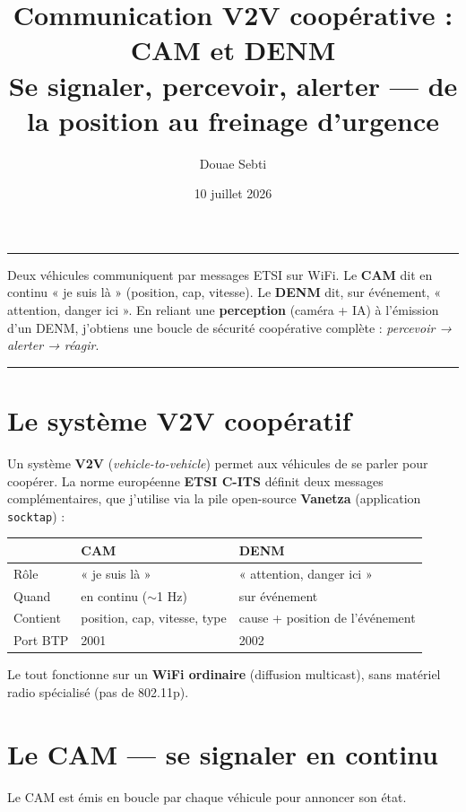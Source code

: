 \documentclass[a4paper,11pt]{article}
\title{\vspace{-1cm}\textbf{Communication V2V coopérative : CAM et DENM\\[3pt]
\large Se signaler, percevoir, alerter --- de la position au freinage d'urgence}}
\author{Douae Sebti}
\date{10 juillet 2026}
\newcommand{\code}[1]{\texttt{#1}}
\begin{document}
\maketitle
\vspace{-6pt}\hrule\vspace{8pt}

\begin{note}
Deux véhicules communiquent par messages ETSI sur WiFi. Le \textbf{CAM} dit en continu
« je suis là » (position, cap, vitesse). Le \textbf{DENM} dit, sur événement,
« attention, danger ici ». En reliant une \textbf{perception} (caméra + IA) à l'émission
d'un DENM, j'obtiens une boucle de sécurité coopérative complète : \emph{percevoir →
alerter → réagir}.
\end{note}

\tableofcontents
\vspace{6pt}\hrule

\section{Le système V2V coopératif}
Un système \textbf{V2V} (\emph{vehicle-to-vehicle}) permet aux véhicules de se parler pour
coopérer. La norme européenne \textbf{ETSI C-ITS} définit deux messages complémentaires,
que j'utilise via la pile open-source \textbf{Vanetza} (application \code{socktap}) :

\begin{center}
\begin{tabularx}{\textwidth}{@{}l X X@{}}
\toprule
 & \textbf{CAM} & \textbf{DENM} \\
\midrule
Rôle & « je suis là » & « attention, danger ici » \\
Quand & en continu ($\sim$1 Hz) & sur événement \\
Contient & position, cap, vitesse, type & cause + position de l'événement \\
Port BTP & 2001 & 2002 \\
\bottomrule
\end{tabularx}
\end{center}

Le tout fonctionne sur un \textbf{WiFi ordinaire} (diffusion multicast), sans matériel radio
spécialisé (pas de 802.11p).

\section{Le CAM --- se signaler en continu}
Le CAM est émis en boucle par chaque véhicule pour annoncer son état.
\end{document}
